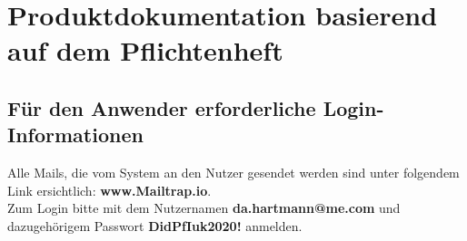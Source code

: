 \documentclass[a4paper,report,headsepline]{scrreprt}
\begin{document}

\label{chart:Projektzeitplan}

\chapter{Produktdokumentation basierend auf dem Pflichtenheft}\label{cha:Produktdokumentation}
\section{Für den Anwender erforderliche Login-Informationen}
Alle Mails, die vom System an den Nutzer gesendet werden sind unter folgendem Link ersichtlich: \textbf{www.Mailtrap.io}. \\
Zum Login bitte mit dem Nutzernamen \dq \textbf{da.hartmann@me.com}\dq{} 
und dazugehörigem Passwort \dq  \textbf{DidPfIuk2020!}\dq{} anmelden.
\end{document}
